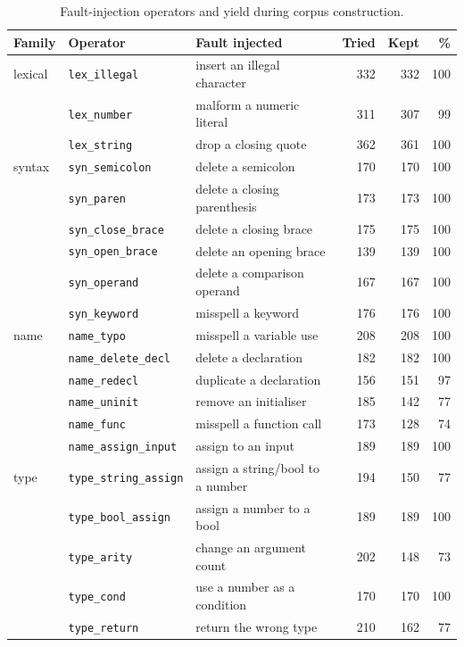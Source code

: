 \begin{longtable}{llp{5.2cm}rrr}
\caption{Fault-injection operators and yield during corpus construction.}\label{tab:ops}\\
\toprule
\textbf{Family} & \textbf{Operator} & \textbf{Fault injected} & \textbf{Tried} & \textbf{Kept} & \textbf{\%}\\
\midrule
\endhead
lexical & \texttt{lex\_illegal} & insert an illegal character & 332 & 332 & 100\\
 & \texttt{lex\_number} & malform a numeric literal & 311 & 307 & 99\\
 & \texttt{lex\_string} & drop a closing quote & 362 & 361 & 100\\
\midrule
syntax & \texttt{syn\_semicolon} & delete a semicolon & 170 & 170 & 100\\
 & \texttt{syn\_paren} & delete a closing parenthesis & 173 & 173 & 100\\
 & \texttt{syn\_close\_brace} & delete a closing brace & 175 & 175 & 100\\
 & \texttt{syn\_open\_brace} & delete an opening brace & 139 & 139 & 100\\
 & \texttt{syn\_operand} & delete a comparison operand & 167 & 167 & 100\\
 & \texttt{syn\_keyword} & misspell a keyword & 176 & 176 & 100\\
\midrule
name & \texttt{name\_typo} & misspell a variable use & 208 & 208 & 100\\
 & \texttt{name\_delete\_decl} & delete a declaration & 182 & 182 & 100\\
 & \texttt{name\_redecl} & duplicate a declaration & 156 & 151 & 97\\
 & \texttt{name\_uninit} & remove an initialiser & 185 & 142 & 77\\
 & \texttt{name\_func} & misspell a function call & 173 & 128 & 74\\
 & \texttt{name\_assign\_input} & assign to an input & 189 & 189 & 100\\
\midrule
type & \texttt{type\_string\_assign} & assign a string/bool to a number & 194 & 150 & 77\\
 & \texttt{type\_bool\_assign} & assign a number to a bool & 189 & 189 & 100\\
 & \texttt{type\_arity} & change an argument count & 202 & 148 & 73\\
 & \texttt{type\_cond} & use a number as a condition & 170 & 170 & 100\\
 & \texttt{type\_return} & return the wrong type & 210 & 162 & 77\\

\end{longtable}
